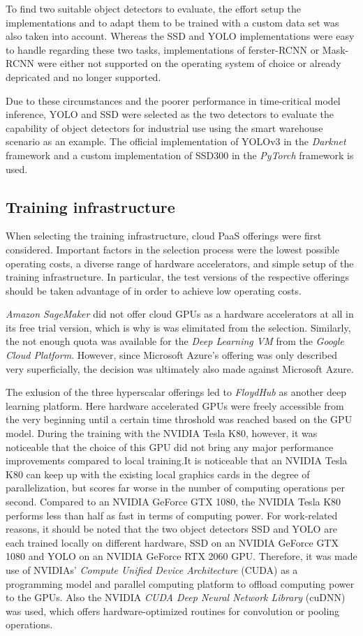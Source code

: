 \documentclass[a4paper, 10pt, journal]{wissarbIEEE}      %
\begin{document}
To find two suitable object detectors to evaluate, the effort setup the implementations and to adapt them to be trained with a custom data set was also taken into account. Whereas the SSD and YOLO implementations were easy to handle regarding these two tasks, implementations of ferster-RCNN or Mask-RCNN were either not supported on the operating system of choice or already depricated and no longer supported. 

Due to these circumstances and the poorer performance in time-critical model inference, YOLO and SSD were selected as the two detectors to evaluate the capability of object detectors for industrial use using the smart warehouse scenario as an example. The official implementation of YOLOv3 in the \textit{Darknet} framework and a custom implementation of SSD300 in the \textit{PyTorch} framework is used.

\subsection{Training infrastructure}

When selecting the training infrastructure, cloud PaaS offerings were first considered. Important factors in the selection process were the lowest possible operating costs, a diverse range of hardware accelerators, and simple setup of the training infrastructure. In particular, the test versions of the respective offerings should be taken advantage of in order to achieve low operating costs.

\textit{Amazon SageMaker} did not offer cloud GPUs as a hardware accelerators at all in its free trial version, which is why is was elimitated from the selection. Similarly, the not enough quota was available for the \textit{Deep Learning VM} from the  \textit{Google Cloud Platform}. However, since Microsoft Azure's offering was only described very superficially, the decision was ultimately also made against Microsoft Azure.

The exlusion of the three hyperscalar offerings led to \textit{FloydHub} as another deep learning platform. Here hardware accelerated GPUs were freely accessible from the very beginning until a certain time throshold was reached based on the GPU model. During the training with the NVIDIA Tesla K80, however, it was noticeable that the choice of this GPU did not bring any major performance improvements compared to local training.It is noticeable that an NVIDIA Tesla K80 can keep up with the existing local graphics cards in the degree of parallelization, but scores far worse in the number of computing operations per second. Compared to an NVIDIA GeForce GTX 1080, the NVIDIA Tesla K80 performs less than half as fast in terms of computing power. For work-related reasons, it should be noted that the two object detectors SSD and YOLO are each trained locally on different hardware, SSD on an NVIDIA GeForce GTX 1080 and YOLO on an NVIDIA GeForce RTX 2060 GPU. Therefore, it was made use of NVIDIAs' \textit{Compute Unified Device Architecture} (CUDA) as a programming model and parallel computing platform to offload computing power to the GPUs. Also the NVIDIA \textit{CUDA Deep Neural Network Library} (cuDNN) was used, which offers hardware-optimized routines for convolution or pooling operations. 
\end{document}
